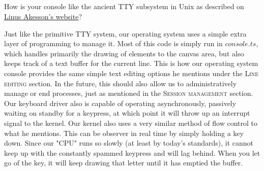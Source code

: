 \documentclass[letterpaper, 10pt,DIV=13]{scrartcl}
\numberwithin{equation}{section} %
\numberwithin{figure}{section} %
\numberwithin{table}{section} %
\begin{document}
\subsection{}
How is your console like the ancient TTY subsystem in Unix as described on \href{https://www.linusakesson.net/programming/tty/}{Linus Akesson's website}?

Just like the primitive TTY system, our operating system uses a simple extra layer of programming to manage it. Most of this code is simply run in $console.ts$, which handles primarily the drawing of elements to the canvas area, but also keeps track of a text buffer for the current line. This is how our operating system console provides the same simple text editing options he mentions under the \textsc{Line editing} section. In the future, this should also allow us to administratively manage or end processes, just as mentioned in the \textsc{Session management} section. Our keyboard driver also is capable of operating asynchronously, passively waiting on standby for a keypress, at which point it will throw up an interrupt signal to the kernel. Our kernel also uses a very similar method of flow control to what he mentions. This can be observer in real time by simply holding a key down. Since our "CPU" runs so slowly (at least by today's standards), it cannot keep up with the constantly spammed keypress and will lag behind. When you let go of the key, it will keep drawing that letter until it has emptied the buffer.
\end{document}
